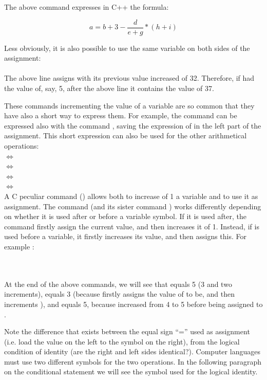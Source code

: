 \documentclass [11pt,a4paper] {book}
\begin{document}
The above command expresses in C++ the formula:

$$ a=b+3-\frac{d}{e+g}*(h+i) $$

Less obviously, it is also possible to use the same variable on both sides of the
assignment:\\
 \\
The above line assigns  with its previous value increased of 32. Therefore, if
 had the value of, say, 5, after the above line it contains the value of 37.

These commands incrementing the value of a variable are so common that they have also a
short way to express them. For example, the command  can be expressed also
with the command , saving the expression of  in the left part of the
assignment. This short expression can also be used for the other arithmetical
operations:\\
 $\Leftrightarrow$  \\
 $\Leftrightarrow$  \\
 $\Leftrightarrow$  \\
 $\Leftrightarrow$  \\


A C peculiar command (\code{++}) allows both to increase of 1 a variable and to use it as
assignment. The command \code{++} (and its sister command \code{--}) works differently
depending on whether it is used after or before a variable symbol. If it is used after,
the command firstly assign the current value, and then increases it of 1. Instead, if
\code{++} is used before a variable, it firstly increases its value, and then assigns
this. For example
:\\
 \\
\\

At the end of the above commands, we will see that  equals 5 (3 and two
increments),  equals 3 (because  firstly assigns the value of
 to be, and then increments ), and  equals 5, because 
increased from 4 to 5 before being assigned to .

Note the difference that exists between the equal sign ``='' used as assignment (i.e.
load the value on the left to the symbol on the right), from the logical condition of
identity (are the right and left sides identical?). Computer languages must use two
different symbols for the two operations. In the following paragraph on the 
conditional statement we will see the symbol used for the logical identity.
\end{document}
